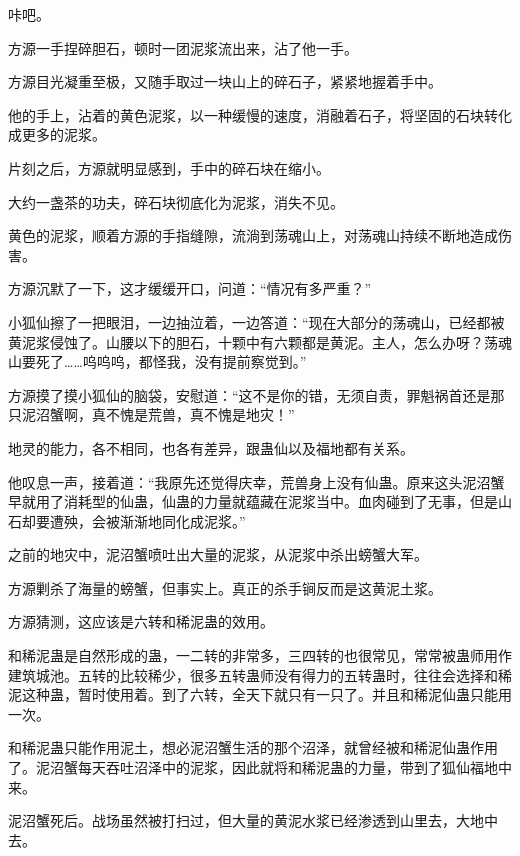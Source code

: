 
\begin{this_body}



咔吧。

方源一手捏碎胆石，顿时一团泥浆流出来，沾了他一手。

方源目光凝重至极，又随手取过一块山上的碎石子，紧紧地握着手中。

他的手上，沾着的黄色泥浆，以一种缓慢的速度，消融着石子，将坚固的石块转化成更多的泥浆。

片刻之后，方源就明显感到，手中的碎石块在缩小。

大约一盏茶的功夫，碎石块彻底化为泥浆，消失不见。

黄色的泥浆，顺着方源的手指缝隙，流淌到荡魂山上，对荡魂山持续不断地造成伤害。

方源沉默了一下，这才缓缓开口，问道：“情况有多严重？”

小狐仙擦了一把眼泪，一边抽泣着，一边答道：“现在大部分的荡魂山，已经都被黄泥浆侵蚀了。山腰以下的胆石，十颗中有六颗都是黄泥。主人，怎么办呀？荡魂山要死了……呜呜呜，都怪我，没有提前察觉到。”

方源摸了摸小狐仙的脑袋，安慰道：“这不是你的错，无须自责，罪魁祸首还是那只泥沼蟹啊，真不愧是荒兽，真不愧是地灾！”

地灵的能力，各不相同，也各有差异，跟蛊仙以及福地都有关系。

他叹息一声，接着道：“我原先还觉得庆幸，荒兽身上没有仙蛊。原来这头泥沼蟹早就用了消耗型的仙蛊，仙蛊的力量就蕴藏在泥浆当中。血肉碰到了无事，但是山石却要遭殃，会被渐渐地同化成泥浆。”

之前的地灾中，泥沼蟹喷吐出大量的泥浆，从泥浆中杀出螃蟹大军。

方源剿杀了海量的螃蟹，但事实上。真正的杀手锏反而是这黄泥土浆。

方源猜测，这应该是六转和稀泥蛊的效用。

和稀泥蛊是自然形成的蛊，一二转的非常多，三四转的也很常见，常常被蛊师用作建筑城池。五转的比较稀少，很多五转蛊师没有得力的五转蛊时，往往会选择和稀泥这种蛊，暂时使用着。到了六转，全天下就只有一只了。并且和稀泥仙蛊只能用一次。

和稀泥蛊只能作用泥土，想必泥沼蟹生活的那个沼泽，就曾经被和稀泥仙蛊作用了。泥沼蟹每天吞吐沼泽中的泥浆，因此就将和稀泥蛊的力量，带到了狐仙福地中来。

泥沼蟹死后。战场虽然被打扫过，但大量的黄泥水浆已经渗透到山里去，大地中去。


\end{this_body}
